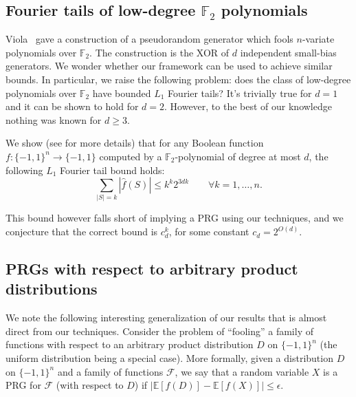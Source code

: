 \documentclass{toc}
\newcommand{\E}{\mathbb{E}}
\newcommand{\F}{\mathbb{F}}
\newcommand{\FF}{\mathcal{F}}
\begin{document}
\subsection{Fourier tails of low-degree \texorpdfstring{$\F_2$}{F2} polynomials}
Viola~\cite{viola2009sum} gave a construction of a pseudorandom generator which fools $n$-variate polynomials over $\F_2$.
The construction is the XOR of $d$ independent small-bias generators.
We wonder whether our framework can be used to achieve
similar bounds. In particular, we raise the following problem: does the class of low-degree polynomials over $\F_2$ have bounded
$L_1$ Fourier tails? It's trivially true for $d=1$ and it can be shown to hold for $d=2$. However, to the best of our knowledge nothing was known for
 $d \ge 3$.

We show (see   for more details) that for any Boolean function $f: \{ -1,1\}^{n} \rightarrow \{-1,1 \}$ computed by a $\F_2$-polynomial of degree at most $d$, the following $L_1$ Fourier tail bound holds: $$ \sum_{|S|=k} |\widehat{f}(S)| \le k^k 2^{3dk} \qquad \forall k=1,\ldots,n.$$

This bound however falls short of  implying a PRG using our techniques, and we conjecture that the correct bound is $c_{d}^{k}$, for some constant $c_d=2^{O(d)}$.

\subsection{PRGs with respect to arbitrary product distributions} We note the following interesting generalization of our results that  is almost direct from our techniques. Consider the problem of ``fooling'' a family of functions with respect to an arbitrary product distribution $D$ on $\{ -1,1\}^n$ (the uniform distribution being a special case). More formally, given a distribution $D$ on $\{-1,1 \}^n$ and a family of functions $\FF$, we say that a random variable $X$ is a PRG for $\FF$ (with respect to $D$) if $|\E[f(D)]  - \E[f(X)]| \le \epsilon$.
\end{document}
